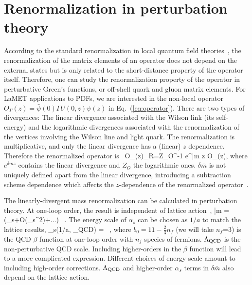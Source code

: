 \section{Renormalization in perturbation theory}\label{sec:theory}

According to the standard renormalization in local quantum field theories~\cite{Collins:1984xc}, the renormalization of the matrix elements of an operator does not depend on the external states but is only related to 
the short-distance property of the operator itself. Therefore, one 
can study the renormalization property of the operator in perturbative Green's functions, 
or off-shell quark and gluon matrix elements. For LaMET applications to PDFs, 
we are interested in the non-local operator $O_{\Gamma}(z)=\bar{\psi}(0) \Gamma U(0,z) \psi (z)$ in Eq.~(\ref{eq:operator}). There
are two types of divergences: The linear divergence associated with the Wilson link (its self-energy) and the logarithmic divergences associated with the renormalization of the vertices involving 
the Wilson line and light quark. 
The renormalization is multiplicative, and only the linear divergence has a (linear) $z$ dependence. Therefore the renormalized operator is~\cite{Ji:2017oey,Ishikawa:2017faj,Green:2017xeu, Ji:2020brr}
\bea\label{eq:Reoperator}
O_{\Gamma}(z)_{R}=Z_{O}^{-1} e^{\delta \bar{m} z} O_\Gamma(z),
\eea
where $e^{\delta \bar{m} z}$ contains the linear divergence and 
$Z_{O}$ the logarithmic ones. $\delta \bar{m}$ is not uniquely defined apart
from the linear divergence, introducing a subtraction
scheme dependence which affects the $z$-dependence of the renormalized operator~\cite{Ji:2020brr}.

The linearly-divergent mass renormalization can be calculated in perturbation theory. At one-loop order, the result is independent of lattice action~\cite{Chen:2016fxx}, 
\bea\label{eq:delta_m}
\delta \bar{m} = (\alpha_s+{\cal O}(\alpha_s^2)+...) \ .
\eea
The energy scale of $\alpha_{s}$ can be chosen as $1/a$ to match the lattice results,
\bea\label{eq:alpha_s}
\alpha_{s}(1/a, \Lambda_{\rm QCD}) =  \ ,
\eea
where $b_{0}=11-\frac{2}{3}n_f$ (we will take $n_f$=3) is the QCD $\beta$ function at one-loop order with $n_f$ species of fermions. $\Lambda_{\rm QCD}$ is the non-perturbative QCD scale. 
Including higher-orders in
the $\beta$ function will lead to a more complicated expression. Different choices
of energy scale amount to including high-order corrections.
$\Lambda_{\rm QCD}$ and higher-order $\alpha_s$ terms in $\delta \bar{m}$ also depend on the lattice action. 

